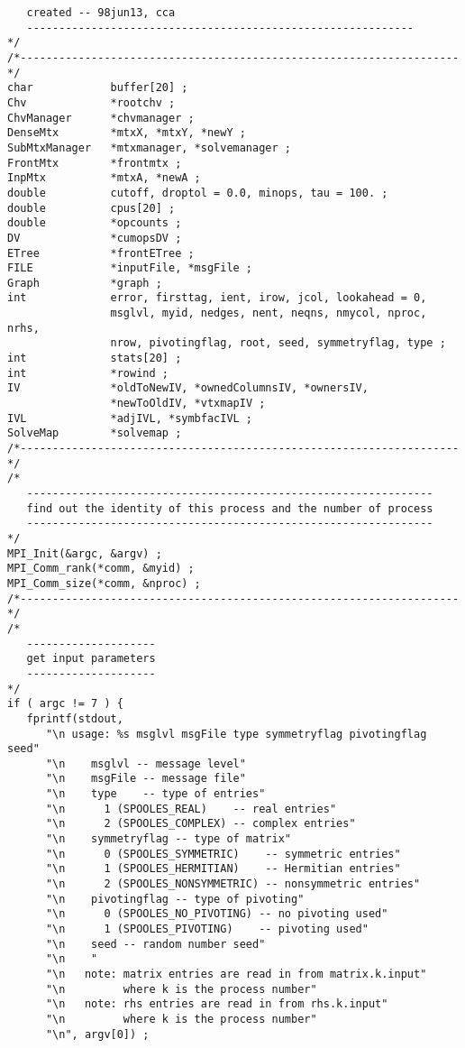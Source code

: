 \begin{verbatim}
   created -- 98jun13, cca
   ------------------------------------------------------------
*/
/*--------------------------------------------------------------------*/
char            buffer[20] ;
Chv             *rootchv ;
ChvManager      *chvmanager ;
DenseMtx        *mtxX, *mtxY, *newY ;
SubMtxManager   *mtxmanager, *solvemanager ;
FrontMtx        *frontmtx ;
InpMtx          *mtxA, *newA ;
double          cutoff, droptol = 0.0, minops, tau = 100. ;
double          cpus[20] ;
double          *opcounts ;
DV              *cumopsDV ;
ETree           *frontETree ;
FILE            *inputFile, *msgFile ;
Graph           *graph ;
int             error, firsttag, ient, irow, jcol, lookahead = 0, 
                msglvl, myid, nedges, nent, neqns, nmycol, nproc, nrhs,
                nrow, pivotingflag, root, seed, symmetryflag, type ;
int             stats[20] ;
int             *rowind ;
IV              *oldToNewIV, *ownedColumnsIV, *ownersIV, 
                *newToOldIV, *vtxmapIV ;
IVL             *adjIVL, *symbfacIVL ;
SolveMap        *solvemap ;
/*--------------------------------------------------------------------*/
/*
   ---------------------------------------------------------------
   find out the identity of this process and the number of process
   ---------------------------------------------------------------
*/
MPI_Init(&argc, &argv) ;
MPI_Comm_rank(*comm, &myid) ;
MPI_Comm_size(*comm, &nproc) ;
/*--------------------------------------------------------------------*/
/*
   --------------------
   get input parameters
   --------------------
*/
if ( argc != 7 ) {
   fprintf(stdout, 
      "\n usage: %s msglvl msgFile type symmetryflag pivotingflag seed"
      "\n    msglvl -- message level"
      "\n    msgFile -- message file"
      "\n    type    -- type of entries"
      "\n      1 (SPOOLES_REAL)    -- real entries"
      "\n      2 (SPOOLES_COMPLEX) -- complex entries"
      "\n    symmetryflag -- type of matrix"
      "\n      0 (SPOOLES_SYMMETRIC)    -- symmetric entries"
      "\n      1 (SPOOLES_HERMITIAN)    -- Hermitian entries"
      "\n      2 (SPOOLES_NONSYMMETRIC) -- nonsymmetric entries"
      "\n    pivotingflag -- type of pivoting"
      "\n      0 (SPOOLES_NO_PIVOTING) -- no pivoting used"
      "\n      1 (SPOOLES_PIVOTING)    -- pivoting used"
      "\n    seed -- random number seed"
      "\n    "
      "\n   note: matrix entries are read in from matrix.k.input"
      "\n         where k is the process number"
      "\n   note: rhs entries are read in from rhs.k.input"
      "\n         where k is the process number"
      "\n", argv[0]) ;

\end{verbatim}
